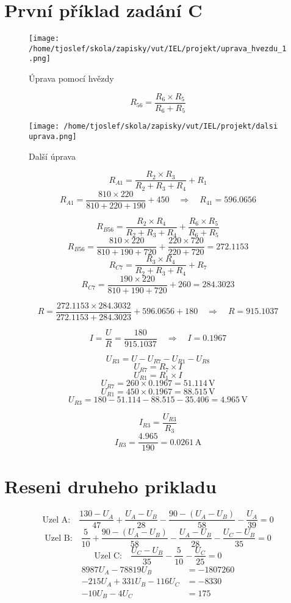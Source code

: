 \documentclass{article}
\begin{document}
\sloppy

\section{První příklad zadání C}

\begin{figure}[!ht]
  \centering
  \texttt{[image: /home/tjoslef/skola/zapisky/vut/IEL/projekt/uprava\_hvezdu\_1.png]}
  \caption{Úprava pomocí hvězdy}
  \label{fig:hvezda}
\end{figure}

\[
    R_{56} = \frac{R_6 \times R_5}{R_6 + R_5}
\]

\begin{figure}[!ht]
  \centering
  \texttt{[image: /home/tjoslef/skola/zapisky/vut/IEL/projekt/dalsi uprava.png]}
  \caption{Další úprava}
  \label{fig:dalsi_uprava}
\end{figure}

\[
R_{A1} = \frac{R_2 \times R_3}{R_2 + R_3 + R_4} + R_1
\]
\[
    R_{A1} = \frac{810 \times 220}{810 + 220 + 190} + 450 \quad \Rightarrow \quad R_{41} = 596.0656
\]

\[
R_{B56} = \frac{R_2 \times R_4}{R_2 + R_3 + R_4} + \frac{R_6 \times R_5}{R_6 + R_5}
\]
\[
R_{B56} = \frac{810 \times 220}{810 + 190 + 720} + \frac{220 \times 720}{220 + 720}
= 272.1153
\]
\[
R_{C7} = \frac{R_3 \times R_4}{R_2 + R_3 + R_4} + R_7
\]
\[
R_{C7} = \frac{190 \times 220}{810 + 190 + 720} + 260 = 284.3023
\]

\[
R  = \frac{272.1153 \times 284.3032}{272.1153 + 284.3023} + 596.0656 + 180 \quad \Rightarrow \quad R = 915.1037
\]

\[
I = \frac{U}{R} = \frac{180}{915.1037} \quad \Rightarrow \quad I = 0.1967
\]

\[
    U_{R3} = U - U_{R7} - U_{R1} - U_{R8}
\]
\[
U_{R7} = R_7 \times I
\]
\[
    U_{R1} = R_1 \times I
\]
\[
U_{R7} = 260 \times 0.1967 = 51.114 \, \text{V}
\]
\[
    U_{R1} = 450 \times 0.1967 = 88.515 \, \text{V}
\]
\[
U_{R3}  = 180 - 51.114 - 88.515 - 35.406  = 4.965 \, \text{V}
\]

\[
I_{R3} = \frac{U_{R3}}{R_3}
\]
\[
I_{R3} = \frac{4.965}{190} = 0.0261 \, \text{A}
\]

\clearpage
\section{Reseni druheho prikladu}
\[
    \text{Uzel A:} \quad \frac{130 - U_A}{47} + \frac{U_A - U_B}{28} - \frac{90 - (U_A - U_B)}{58} - \frac{U_A}{39} = 0
\]
\[
    \text{Uzel B:} \quad \frac{5}{10} + \frac{90 - (U_A - U_B)}{58} - \frac{U_A - U_B}{28} - \frac{U_C - U_B}{35} = 0
\]
\[
    \text{Uzel C:} \quad \frac{U_C - U_B}{35} - \frac{5}{10} - \frac{U_C}{25} = 0
\]
\begin{align*}
    8987U_A - 78819U_B &= -1807260 \\
    -215U_A + 331U_B - 116U_C &= -8330 \\
    -10U_B - 4U_C &= 175
\end{align*}
\end{document}
